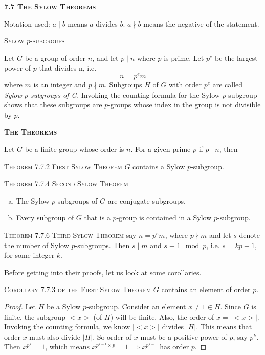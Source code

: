 \documentclass[12pt]{article}
\begin{document}
\textbf { \textsc {7.7 The Sylow Theorems}}
\par
{\small Notation used: $a \mid b$ means $a$ divides $b$. $a \nmid b$ means the negative of the statement.}
\par
\textsc {Sylow $p$-subgroups}
\par
Let $G$ be a group of order $n$, and let $p \mid n$ where $p$ is prime. Let $p^{e}$ be the largest power of $p$ that divides n, i.e.
\begin{equation*}
n=p^{e}m
\end{equation*}
where $m$ is an integer and $p \nmid m$. Subgroups $H$ of $G$ with order $p^{e}$ are called \emph {Sylow $p$-subgroups of G}. Invoking the counting formula for the Sylow $p$-subgroup shows that these subgroups are $p$-groups whose index in the group is not divisible by $p$.
\par
\textbf {\textsc {The Theorems}}
\par
Let $G$ be a finite group whose order is $n$. For a given prime $p$ if $p \mid n$, then
\par
\textsc {{\small Theorem 7.7.2} First Sylow Theorem } $G$ contains a Sylow $p$-subgroup.
\par
\textsc {{\small Theorem 7.7.4} Second Sylow Theorem } 
\begin{enumerate}[(a)]
\item The Sylow $p$-subgroups of $G$ are conjugate subgroups.
\item Every subgroup of $G$ that is a $p$-group is contained in a Sylow $p$-subgroup.
\end{enumerate}
\par
\textsc {{\small Theorem 7.7.6} Third Sylow Theorem } say $n=p^{e}m$, where $p \nmid m$ and let $s$ denote the number of Sylow $p$-subgroups. Then $s \mid m$ and $s \equiv 1 \mod{p}$, i.e. $s = kp + 1$, for some integer $k$.\\
\par
Before getting into their proofs, let us look at some corollaries.
\par
\textsc {Corollary 7.7.3 {\small of the First Sylow Theorem }}
$G$ contains an element of order $p$.
\begin{proof}
Let $H$ be a Sylow $p$-subgroup. Consider an element $x \neq 1 \in H$. Since $G$ is finite, the subgroup $<x>$ (of $H$) will be finite. Also, the order of $x=|<x>|$. Invoking the counting formula, we know $|<x>|$ divides $|H|$. This means that order $x$ must also divide $|H|$. So order of $x$ must be a positive power of $p$, say $p^{k}$.\\
Then $x^{p^{k}}=1$, which means $x^{p^{k-1}\times p}=1$ $\Rightarrow x^{p^{k-1}}$ has order $p$.
\end{proof}
\end{document}
